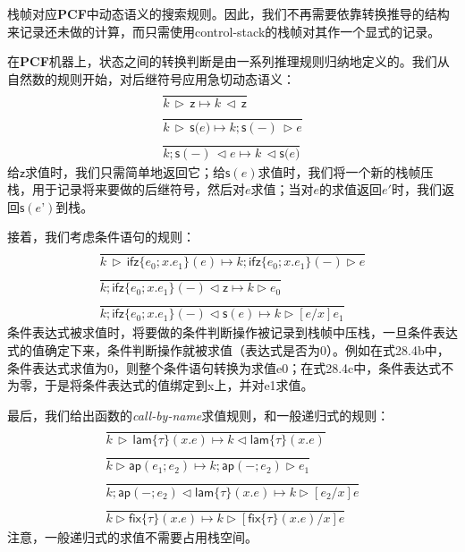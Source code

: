 栈帧对应\textbf{PCF}中动态语义的搜索规则。因此，我们不再需要依靠转换推导的结构来记录还未做的计算，而只需使用\gls{control-stack}的栈帧对其作一个显式的记录。

在\textbf{PCF}机器上，状态之间的转换判断是由一系列推理规则归纳地定义的。我们从自然数的规则开始，对后继符号应用急切动态语义：
\begin{subequations}
    \begin{gather}
       \dfrac{}{k \, \triangleright \, \mathsf{z} \longmapsto k \, \triangleleft \, \mathsf{z}}\\
       \dfrac{}{k \, \triangleright \, \mathsf{s(} e \mathsf{)} \longmapsto k; \mathsf{s(-)} \, \triangleright e}\\
       \dfrac{}{k; \mathsf{s(-)} \, \triangleleft e \longmapsto k\, \triangleleft \mathsf{s(} e \mathsf{)}}
    \end{gather}
\end{subequations}
给$\mathsf{z}$求值时，我们只需简单地返回它；给$\mathsf{s} (e)$求值时，我们将一个新的栈帧压栈，用于记录将来要做的后继符号，然后对$e$求值；当对$e$的求值返回$e'$时，我们返回$\mathsf{s} (e’)$到栈。

接着，我们考虑条件语句的规则：
\begin{subequations}
    \begin{gather}
       \dfrac{}{k \, \triangleright \, \mathsf{ifz} \{ e_0;x.e_1 \} (e) \longmapsto k; \mathsf{ifz} \{ e_0;x.e_1 \} (-) \triangleright e}\\
       \dfrac{}{k; \mathsf{ifz} \{ e_0;x.e_1 \} (-) \triangleleft \mathsf{z} \longmapsto k \triangleright e_0}\\
       \dfrac{}{k; \mathsf{ifz} \{ e_0;x.e_1 \} (-) \triangleleft \mathsf{s} (e) \longmapsto k \triangleright [e/x]e_1}
    \end{gather}
\end{subequations}
条件表达式被求值时，将要做的条件判断操作被记录到栈帧中压栈，一旦条件表达式的值确定下来，条件判断操作就被求值（表达式是否为0）。例如在式28.4b中，条件表达式求值为0，则整个条件语句转换为求值e0；在式28.4c中，条件表达式不为零，于是将条件表达式的值绑定到x上，并对e1求值。

最后，我们给出函数的\textit{call-by-name}求值规则，和一般递归式的规则：
\begin{subequations}
    \begin{gather}
       \dfrac{}{k \, \triangleright \, \mathsf{lam} \{ \tau \} (x.e) \longmapsto k \triangleleft \mathsf{lam} \{ \tau \} (x.e)}\\
       \dfrac{}{k \triangleright \mathsf{ap} (e_1;e_2) \longmapsto k; \mathsf{ap} (-;e_2) \triangleright e_1 }\\
       \dfrac{}{k; \mathsf{ap} (-;e_2) \triangleleft \mathsf{lam} \{ \tau \} (x.e) \longmapsto k \triangleright [e_2/x]e }\\
       \dfrac{}{k \triangleright \mathsf{fix} \{ \tau \} (x.e) \longmapsto k \triangleright [ \mathsf{fix} \{ \tau \} (x.e)/x]e}
    \end{gather}
\end{subequations}
注意，一般递归式的求值不需要占用栈空间。

